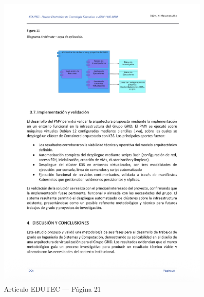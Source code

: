 \begin{figure}[H]
    \centering
    \begin{tcolorbox}[
        colback=white,
        colframe=gray!50,
        boxrule=1pt,
        arc=2pt,
        boxsep=5pt,
        left=3pt,
        right=3pt,
        top=3pt,
        bottom=3pt,
        drop shadow
    ]
        \includegraphics[width=0.95\textwidth,keepaspectratio]{apendices/EDUTEC/21.png}
    \end{tcolorbox}
    \caption{Artículo EDUTEC --- Página 21}\label{fig:edutec-pagina-21}
\end{figure}
\FloatBarrier

